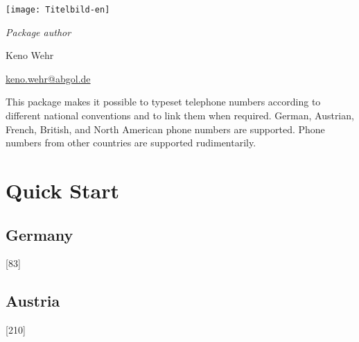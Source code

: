 \documentclass[numbers=noenddot]{scrreprt}
\begin{document}
\begin{titlepage}
\begin{center}
\texttt{[image: Titelbild-en]}

\vfill
\Large
\textit{Package author}

\medskip
Keno Wehr

\large
\smallskip
\url{keno.wehr@abgol.de}
\end{center}

\vfill
\noindent This package makes it possible to typeset telephone numbers according to different national conventions and to link them when required. German, Austrian, French, British, and North American phone numbers are supported. Phone numbers from other countries are supported rudimentarily.
\end{titlepage}

\tableofcontents


\chapter{Quick Start}
\section{Germany}
\begin{sidebyside}
  [83]
\end{sidebyside}
\begin{sidebyside}
\end{sidebyside}
\begin{sidebyside}
\end{sidebyside}
\begin{sidebyside}
\end{sidebyside}

\section{Austria}
\begin{sidebyside}
  [210]
\end{sidebyside}

\begin{sidebyside}
\end{sidebyside}
\end{document}
